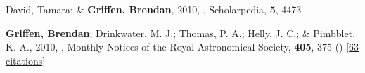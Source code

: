 \item[{\color{numcolor}\scriptsize2}] David, Tamara; \& \textbf{Griffen, Brendan}, 2010, , Scholarpedia, \textbf{5}, 4473

\item[{\color{numcolor}\scriptsize1}] \textbf{Griffen, Brendan}; Drinkwater, M. J.; Thomas, P. A.; Helly, J. C.; \& Pimbblet, K. A., 2010, , Monthly Notices of the Royal Astronomical Society, \textbf{405}, 375 () [\href{https://ui.adsabs.harvard.edu/abs/2010MNRAS.405..375G}{63 citations}]